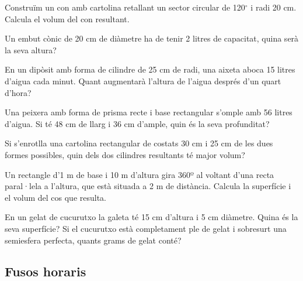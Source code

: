 \begin{activitats}
\begin{mylist}

\exer  Construïm un con amb cartolina retallant un sector circular de 120${}^\circ$ i radi 20 cm. Calcula el volum del con resultant.


\exer  Un embut cònic de 20 cm de diàmetre ha de tenir 2 litres de capacitat, quina serà la seva altura?


\exer  En un dipòsit amb forma de cilindre de 25 cm de radi, una aixeta aboca 15 litres d'aigua cada minut. Quant augmentarà l'altura de l'aigua després d'un quart d'hora?


\exer Una peixera amb forma de prisma recte i base rectangular s'omple amb 56 litres d'aigua. Si té 48 cm de llarg i 36 cm d'ample, quin és la seva profunditat?


\exer  Si s'enrotlla una cartolina rectangular de costats 30 cm i 25 cm de les dues formes possibles, quin dels dos cilindres resultants té major volum?


\exer  Un rectangle d'1 m de base i 10 m d'altura gira 360º al voltant d'una recta paral·lela a l'altura, que està situada a 2 m de distància. Calcula la superfície i el volum del cos que resulta.


\exer  En un gelat de cucurutxo la galeta té 15 cm d'altura i 5 cm diàmetre. Quina és la seva superfície? Si el cucurutxo està completament ple de gelat i sobresurt una semiesfera perfecta, quants grams de gelat conté?

 
\end{mylist}

\subsection{Fusos horaris}


\end{activitats}
